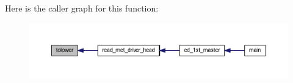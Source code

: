 Here is the caller graph for this function\+:\nopagebreak
\begin{figure}[H]
\begin{center}
\leavevmode
\includegraphics[width=350pt]{charutils_8f90_a2bd99695e205166c38b103139c05d3cf_icgraph}
\end{center}
\end{figure}


